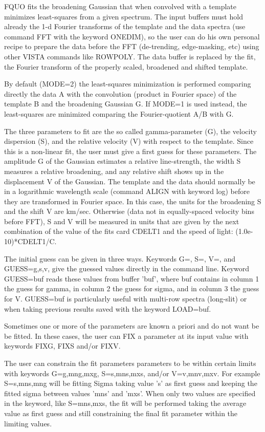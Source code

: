 FQUO fits the broadening Gaussian that when convolved with a template
minimizes least-squares from a given spectrum. The input buffers must hold
already the 1-d Fourier transforms of the template and the data spectra
(use command FFT with the keyword ONEDIM), so the user can do his own
personal recipe to prepare the data before the FFT (de-trending,
edge-masking, etc) using other VISTA commands like ROWPOLY. The data buffer
is replaced by the fit, the Fourier transform of the properly scaled,
broadened and shifted template.

By default (MODE=2) the least-squares minimization is performed comparing
directly the data A with the convolution (product in Fourier space) of the
template B and the broadening Gaussian G. If MODE=1 is used instead, the
least-squares are minimized comparing the Fourier-quotient A/B with G.

The three parameters to fit are the so called gamma-parameter (G), the
velocity dispersion (S), and the relative velocity (V) with respect to the
template. Since this is a non-linear fit, the user must give a first guess
for these parameters. The amplitude G of the Gaussian estimates a relative
line-strength, the width S measures a relative broadening, and any relative
shift shows up in the displacement V of the Gaussian. The template and the
data should normally be in a logarithmic wavelength scale (command ALIGN
with keyword log) before they are transformed in Fourier space. In this
case, the units for the broadening S and the shift V are km/sec. Otherwise
(data not in equally-spaced velocity bins before FFT), S and V will be
measured in units that are given by the next combination of the value of
the fits card CDELT1 and the speed of light: (1.0e-10)*CDELT1/C.

The initial guess can be given in three ways. Keywords G=, S=, V=, and
GUESS=g,s,v, give the guessed values directly in the command line. Keyword
GUESS=buf reads these values from buffer 'buf', where buf contains in
column 1 the guess for gamma, in column 2 the guess for sigma, and in
column 3 the guess for V. GUESS=buf is particularly useful with multi-row
spectra (long-slit) or when taking previous results saved with the keyword
LOAD=buf.

Sometimes one or more of the parameters are known a priori and do not want
be be fitted. In these cases, the user can FIX a parameter at its input
value with keywords FIXG, FIXS and/or FIXV.

The user can constrain the fit parameters parameters to be within certain
limits with keywords G=g,mng,mxg, S=s,mns,mxs, and/or V=v,mnv,mxv. For
example S=s,mns,mng will be fitting Sigma taking value 's' as first guess
and keeping the fitted sigma between values 'mns' and 'mxs'. When only two
values are specified in the keyword, like S=mns,mxs, the fit will be
performed taking the average value as first guess and still constraining
the final fit parameter within the limiting values.

